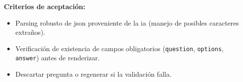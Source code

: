 \textbf{Criterios de aceptación:}
\begin{itemize}
\item Parsing robusto de \gls{json} proveniente de la \gls{ia} (manejo de posibles caracteres extraños).
\item Verificación de existencia de campos obligatorios (\texttt{question}, \texttt{options}, \texttt{answer}) antes de renderizar.
\item Descartar pregunta o regenerar si la validación falla.
\end{itemize}
